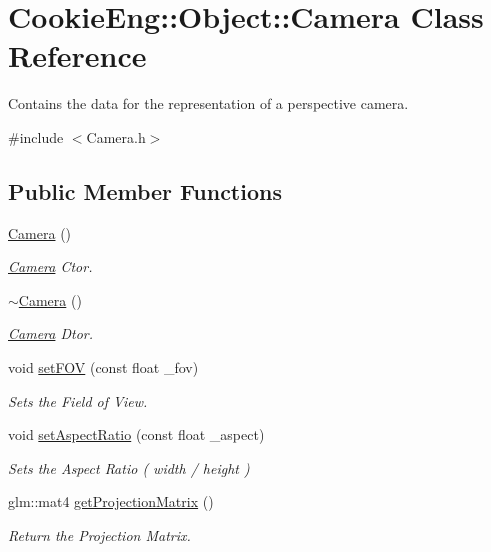 \hypertarget{class_cookie_eng_1_1_object_1_1_camera}{}\section{Cookie\+Eng\+:\+:Object\+:\+:Camera Class Reference}
\label{class_cookie_eng_1_1_object_1_1_camera}


Contains the data for the representation of a perspective camera.  




{\ttfamily \#include $<$Camera.\+h$>$}

\subsection*{Public Member Functions}
\begin{DoxyCompactItemize}
\item 
\hyperlink{class_cookie_eng_1_1_object_1_1_camera_aa98f73385bfef2dd29f3763dd6a7549c}{Camera} ()
\begin{DoxyCompactList}\small\item\em \hyperlink{class_cookie_eng_1_1_object_1_1_camera}{Camera} Ctor. \end{DoxyCompactList}\item 
\hyperlink{class_cookie_eng_1_1_object_1_1_camera_a8d672ca800d63af6fe3d6665471a2b05}{$\sim$\+Camera} ()
\begin{DoxyCompactList}\small\item\em \hyperlink{class_cookie_eng_1_1_object_1_1_camera}{Camera} Dtor. \end{DoxyCompactList}\item 
void \hyperlink{class_cookie_eng_1_1_object_1_1_camera_aef44a3e6cef1540be7e8bcb977dddd78}{set\+F\+OV} (const float \+\_\+fov)
\begin{DoxyCompactList}\small\item\em Sets the Field of View. \end{DoxyCompactList}\item 
void \hyperlink{class_cookie_eng_1_1_object_1_1_camera_a2a86235e64f591e8c812f1d69be30a94}{set\+Aspect\+Ratio} (const float \+\_\+aspect)
\begin{DoxyCompactList}\small\item\em Sets the Aspect Ratio ( width / height ) \end{DoxyCompactList}\item 
glm\+::mat4 \hyperlink{class_cookie_eng_1_1_object_1_1_camera_afa69ef269138610423e2dc8707720500}{get\+Projection\+Matrix} ()
\begin{DoxyCompactList}\small\item\em Return the Projection Matrix. \end{DoxyCompactList}\end{DoxyCompactItemize}

